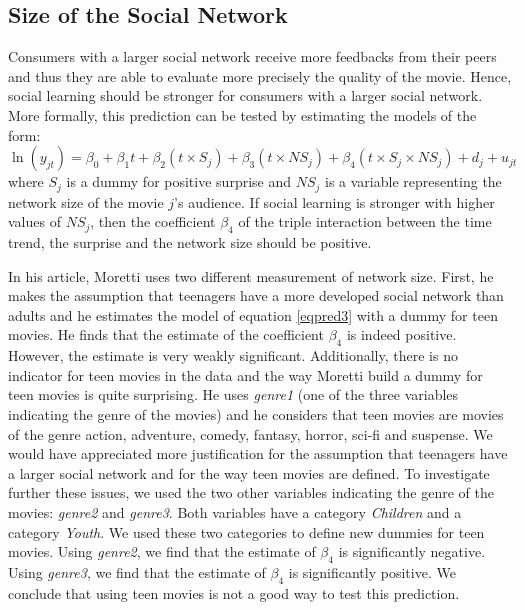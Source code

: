 \subsection{Size of the Social Network}\label{subsec2.4}

Consumers with a larger social network receive more feedbacks from their peers and thus they are able to evaluate more precisely the quality of the movie.
Hence, social learning should be stronger for consumers with a larger social network.
More formally, this prediction can be tested by estimating the models of the form:
\begin{equation}
	\ln (y_{jt})  = \beta_0 + \beta_1 t + \beta_2 (t \times S_j) + \beta_3 (t \times NS_j) + \beta_4 (t \times S_j \times NS_j) + d_j + u_{jt}
	\label{eqpred3}
\end{equation}
where $S_j$ is a dummy for positive surprise and $NS_j$ is a variable representing the network size of the movie $j$'s audience.
If social learning is stronger with higher values of $NS_j$, then the coefficient $\beta_4$ of the triple interaction between the time trend, the surprise and the network size should be positive.

In his article, Moretti uses two different measurement of network size.
First, he makes the assumption that teenagers have a more developed social network than adults and he estimates the model of equation \ref{eqpred3} with a dummy for teen movies.
He finds that the estimate of the coefficient $\beta_4$ is indeed positive.
However, the estimate is very weakly significant.
Additionally, there is no indicator for teen movies in the data and the way Moretti build a dummy for teen movies is quite surprising.
He uses \textit{genre1} (one of the three variables indicating the genre of the movies) and he considers that teen movies are movies of the genre action, adventure, comedy, fantasy, horror, sci-fi and suspense.
We would have appreciated more justification for the assumption that teenagers have a larger social network and for the way teen movies are defined.
To investigate further these issues, we used the two other variables indicating the genre of the movies: \textit{genre2} and \textit{genre3}.
Both variables have a category \textit{Children} and a category \textit{Youth}.
We used these two categories to define new dummies for teen movies.
Using \textit{genre2}, we find that the estimate of $\beta_4$ is significantly negative.
Using \textit{genre3}, we find that the estimate of $\beta_4$ is significantly positive.
We conclude that using teen movies is not a good way to test this prediction.

